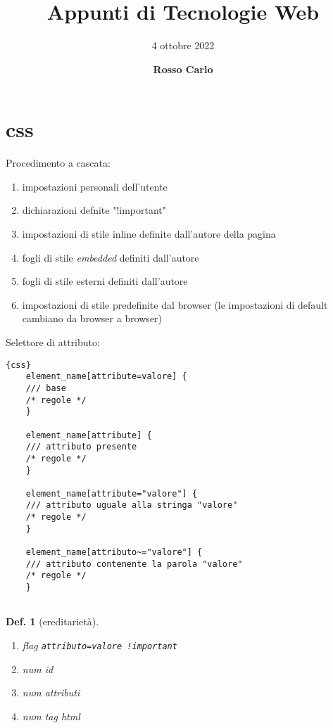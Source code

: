 \documentclass[11pt]{article}
\title{\vspace{2cm}\textbf{Appunti di Tecnologie Web}}
\author{\vspace{3mm}4 ottobre 2022}
\date{\vspace{3mm} \textbf{Rosso Carlo}}
\newtheorem{definition}{Def.}[section]
\begin{document}
\begin{titlepage}
	\maketitle
	\thispagestyle{empty}
\end{titlepage}
\tableofcontents
\newpage

\section{css}
Procedimento a cascata:
\begin{enumerate}
	\item impostazioni personali dell'utente
	\item dichiarazioni defnite "!important"
	\item impostazioni di stile inline definite dall'autore della pagina
	\item fogli di stile \textit{embedded} definiti dall'autore
	\item fogli di stile esterni definiti dall'autore
	\item impostazioni di stile predefinite dal browser (le impostazioni di 
	default cambiano da browser a browser)
\end{enumerate}

Selettore di attributo:
\begin{lstlisting}{css}
	element_name[attribute=valore] { 
	/// base
	/* regole */
	}

	element_name[attribute] { 
	/// attributo presente
	/* regole */
	}

	element_name[attribute="valore"] { 
	/// attributo uguale alla stringa "valore"
	/* regole */
	}

	element_name[attributo~="valore"] { 
	/// attributo contenente la parola "valore"
	/* regole */
	}
	
\end{lstlisting}

\begin{definition}[ereditarietà]
	\begin{enumerate}
		\item flag \lstinline{attributo=valore !important}
		\item num id
		\item num attributi
		\item num tag html
	\end{enumerate}
\end{definition}
\end{document}

